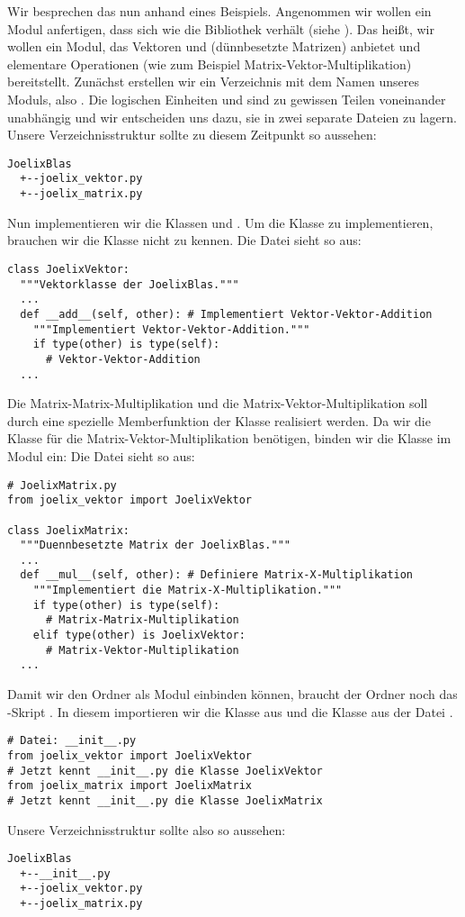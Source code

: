 Wir besprechen das nun anhand eines Beispiels.
Angenommen wir wollen ein Modul  anfertigen, dass sich wie die Bibliothek  verhält (siehe \cite{joelixC}).
Das heißt, wir wollen ein Modul, das Vektoren und (dünnbesetzte Matrizen) anbietet und elementare Operationen (wie zum Beispiel Matrix-Vektor-Multiplikation) bereitstellt.
Zunächst erstellen wir ein Verzeichnis mit dem Namen unseres Moduls, also .
Die logischen Einheiten  und  sind zu gewissen Teilen voneinander unabhängig und wir entscheiden uns dazu, sie in zwei separate Dateien zu lagern.
Unsere Verzeichnisstruktur sollte zu diesem Zeitpunkt so aussehen:
\begin{lstlisting}[language=plain]
JoelixBlas
  +--joelix_vektor.py
  +--joelix_matrix.py
\end{lstlisting}
Nun implementieren wir die Klassen  und .
Um die Klasse  zu implementieren, brauchen wir die Klasse  nicht zu kennen.
Die Datei  sieht so aus:
\begin{lstlisting}
class JoelixVektor:
  """Vektorklasse der JoelixBlas."""
  ...
  def __add__(self, other): # Implementiert Vektor-Vektor-Addition
    """Implementiert Vektor-Vektor-Addition."""
    if type(other) is type(self):
      # Vektor-Vektor-Addition
  ...
\end{lstlisting}
Die Matrix-Matrix-Multiplikation und die Matrix-Vektor-Multiplikation soll durch eine spezielle Memberfunktion der Klasse  realisiert werden.
Da wir die Klasse  für die Matrix-Vektor-Multiplikation benötigen, binden wir die Klasse  im Modul  ein:
Die Datei  sieht so aus:
\begin{lstlisting}
# JoelixMatrix.py
from joelix_vektor import JoelixVektor

class JoelixMatrix:
  """Duennbesetzte Matrix der JoelixBlas."""
  ...
  def __mul__(self, other): # Definiere Matrix-X-Multiplikation
    """Implementiert die Matrix-X-Multiplikation."""
    if type(other) is type(self):
      # Matrix-Matrix-Multiplikation
    elif type(other) is JoelixVektor:
      # Matrix-Vektor-Multiplikation
  ...
\end{lstlisting}
Damit wir den Ordner  als Modul einbinden können, braucht der Ordner  noch das \Python-Skript .
In diesem importieren wir die Klasse  aus  und die Klasse  aus der Datei .
\begin{lstlisting}
# Datei: __init__.py
from joelix_vektor import JoelixVektor
# Jetzt kennt __init__.py die Klasse JoelixVektor
from joelix_matrix import JoelixMatrix
# Jetzt kennt __init__.py die Klasse JoelixMatrix
\end{lstlisting}
Unsere Verzeichnisstruktur sollte also so aussehen:
\begin{lstlisting}[language=plain]
JoelixBlas
  +--__init__.py
  +--joelix_vektor.py
  +--joelix_matrix.py
\end{lstlisting}

